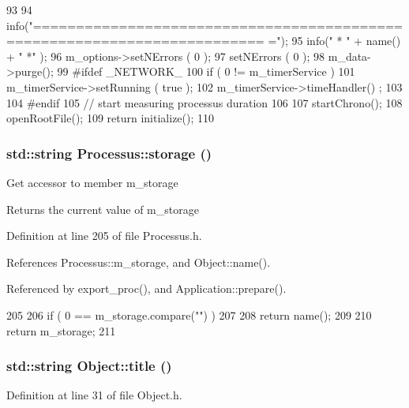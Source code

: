 \begin{DoxyCode}
93                                       {
94   info("=========================================================================
      =");
95   info("   * " + name() + " *" );
96   m_options->setNErrors ( 0 );
97   setNErrors ( 0 );
98   m_data->purge();
99 #ifdef _NETWORK_
100   if ( 0 != m_timerService ){
101     m_timerService->setRunning ( true );
102     m_timerService->timeHandler() ;
103   }
104 #endif
105   // start measuring processus duration
106   
107   startChrono();
108   openRootFile();
109   return initialize();
110 }
\end{DoxyCode}
\hypertarget{classProcessus_a33fa1a0b54a636e5cdd680669fd9ea51}{
\subsubsection[{storage}]{\setlength{\rightskip}{0pt plus 5cm}std::string Processus::storage ()}}
\label{classProcessus_a33fa1a0b54a636e5cdd680669fd9ea51}
Get accessor to member m\_\-storage \begin{DoxyReturn}{Returns}
the current value of m\_\-storage 
\end{DoxyReturn}


Definition at line 205 of file Processus.h.

References Processus::m\_\-storage, and Object::name().

Referenced by export\_\-proc(), and Application::prepare().


\begin{DoxyCode}
205                        {
206     if ( 0 == m_storage.compare("") )
207     {
208       return name();
209     }
210     return m_storage;
211   }
\end{DoxyCode}
\hypertarget{classObject_a73a0f1a41828fdd8303dd662446fb6c3}{
\subsubsection[{title}]{\setlength{\rightskip}{0pt plus 5cm}std::string Object::title ()}}
\label{classObject_a73a0f1a41828fdd8303dd662446fb6c3}


Definition at line 31 of file Object.h.

